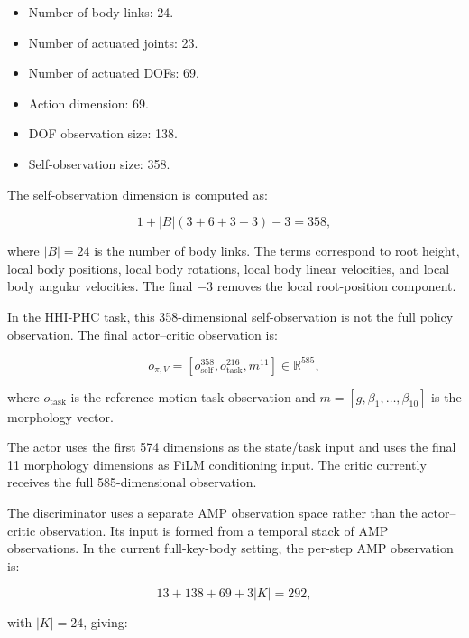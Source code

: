 \documentclass[11pt,a4paper]{article}
\begin{document}
\begin{itemize}[leftmargin=2em]
    \item Number of body links: 24.
    \item Number of actuated joints: 23.
    \item Number of actuated DOFs: 69.
    \item Action dimension: 69.
    \item DOF observation size: 138.
    \item Self-observation size: 358.
\end{itemize}

The self-observation dimension is computed as:

\begin{equation}
    1 + |B|(3+6+3+3) - 3 = 358,
\end{equation}

where $|B|=24$ is the number of body links. The terms correspond to root height, local body positions, local body rotations, local body linear velocities, and local body angular velocities. The final $-3$ removes the local root-position component.

In the HHI-PHC task, this 358-dimensional self-observation is not the full policy observation. The final actor--critic observation is:

\begin{equation}
    o_{\pi,V}
        =
        [
            o_{\mathrm{self}}^{358},
            o_{\mathrm{task}}^{216},
            m^{11}
        ]
    \in \mathbb{R}^{585},
\end{equation}

where $o_{\mathrm{task}}$ is the reference-motion task observation and $m=[g,\beta_1,\ldots,\beta_{10}]$ is the morphology vector.

The actor uses the first 574 dimensions as the state/task input and uses the final 11 morphology dimensions as FiLM conditioning input. The critic currently receives the full 585-dimensional observation.

The discriminator uses a separate AMP observation space rather than the actor--critic observation. Its input is formed from a temporal stack of AMP observations. In the current full-key-body setting, the per-step AMP observation is:

\begin{equation}
    13 + 138 + 69 + 3|K| = 292,
\end{equation}

with $|K|=24$, giving:
\end{document}
